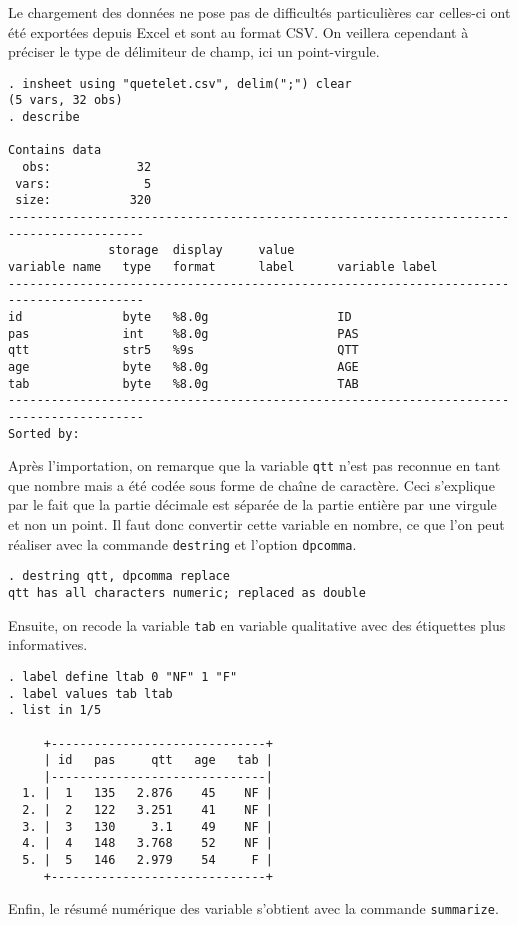\soln{\ref{exo:10.2}}
Le chargement des données ne pose pas de difficultés particulières car
celles-ci ont été exportées depuis Excel et sont au format CSV. On veillera
cependant à préciser le type de délimiteur de champ, ici un point-virgule.
\begin{verbatim}
. insheet using "quetelet.csv", delim(";") clear
(5 vars, 32 obs)
. describe

Contains data
  obs:            32                          
 vars:             5                          
 size:           320                          
-----------------------------------------------------------------------------------------
              storage  display     value
variable name   type   format      label      variable label
-----------------------------------------------------------------------------------------
id              byte   %8.0g                  ID
pas             int    %8.0g                  PAS
qtt             str5   %9s                    QTT
age             byte   %8.0g                  AGE
tab             byte   %8.0g                  TAB
-----------------------------------------------------------------------------------------
Sorted by:
\end{verbatim}
Après l'importation, on remarque que la variable \texttt{qtt} n'est pas
reconnue en tant que nombre mais a été codée sous forme de chaîne de
caractère. Ceci s'explique par le fait que la partie décimale est séparée de
la partie entière par une virgule et non un point. Il faut donc convertir cette
variable en nombre, ce que l'on peut réaliser avec la commande
\texttt{destring} et l'option \texttt{dpcomma}.
\begin{verbatim}
. destring qtt, dpcomma replace
qtt has all characters numeric; replaced as double
\end{verbatim}
Ensuite, on recode la variable \texttt{tab} en variable qualitative avec des
étiquettes plus informatives. 
\begin{verbatim}
. label define ltab 0 "NF" 1 "F"
. label values tab ltab
. list in 1/5

     +------------------------------+
     | id   pas     qtt   age   tab |
     |------------------------------|
  1. |  1   135   2.876    45    NF |
  2. |  2   122   3.251    41    NF |
  3. |  3   130     3.1    49    NF |
  4. |  4   148   3.768    52    NF |
  5. |  5   146   2.979    54     F |
     +------------------------------+
\end{verbatim}
Enfin, le résumé numérique des variable s'obtient avec la commande \texttt{summarize}.

